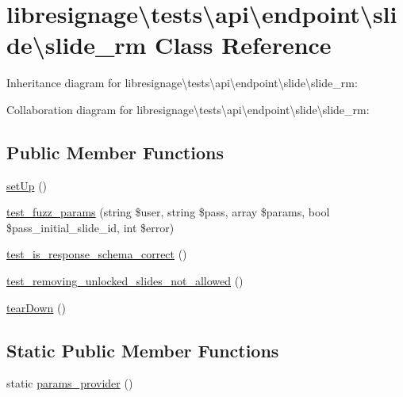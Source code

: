 \hypertarget{classlibresignage_1_1tests_1_1api_1_1endpoint_1_1slide_1_1slide__rm}{}\section{libresignage\textbackslash{}tests\textbackslash{}api\textbackslash{}endpoint\textbackslash{}slide\textbackslash{}slide\+\_\+rm Class Reference}
\label{classlibresignage_1_1tests_1_1api_1_1endpoint_1_1slide_1_1slide__rm}


Inheritance diagram for libresignage\textbackslash{}tests\textbackslash{}api\textbackslash{}endpoint\textbackslash{}slide\textbackslash{}slide\+\_\+rm\+:


Collaboration diagram for libresignage\textbackslash{}tests\textbackslash{}api\textbackslash{}endpoint\textbackslash{}slide\textbackslash{}slide\+\_\+rm\+:
\subsection*{Public Member Functions}
\begin{DoxyCompactItemize}
\item 
\hyperlink{classlibresignage_1_1tests_1_1api_1_1endpoint_1_1slide_1_1slide__rm_a72ca8e5e27c409286756583660dbccf7}{set\+Up} ()
\item 
\hyperlink{classlibresignage_1_1tests_1_1api_1_1endpoint_1_1slide_1_1slide__rm_a48f101ed89e3c47b3304ffcc410ddd22}{test\+\_\+fuzz\+\_\+params} (string \$user, string \$pass, array \$params, bool \$pass\+\_\+initial\+\_\+slide\+\_\+id, int \$error)
\item 
\hyperlink{classlibresignage_1_1tests_1_1api_1_1endpoint_1_1slide_1_1slide__rm_a37bf0aff36ef6fed34a712bc7cd624dc}{test\+\_\+is\+\_\+response\+\_\+schema\+\_\+correct} ()
\item 
\hyperlink{classlibresignage_1_1tests_1_1api_1_1endpoint_1_1slide_1_1slide__rm_a4cc1483e11f104572a3a94b0a8aa066a}{test\+\_\+removing\+\_\+unlocked\+\_\+slides\+\_\+not\+\_\+allowed} ()
\item 
\hyperlink{classlibresignage_1_1tests_1_1api_1_1endpoint_1_1slide_1_1slide__rm_a5b9a6f42f97d4806b7d7c5dae269e700}{tear\+Down} ()
\end{DoxyCompactItemize}
\subsection*{Static Public Member Functions}
\begin{DoxyCompactItemize}
\item 
static \hyperlink{classlibresignage_1_1tests_1_1api_1_1endpoint_1_1slide_1_1slide__rm_a04a73421fcc72354b3e3ce4a5d900c38}{params\+\_\+provider} ()
\end{DoxyCompactItemize}
